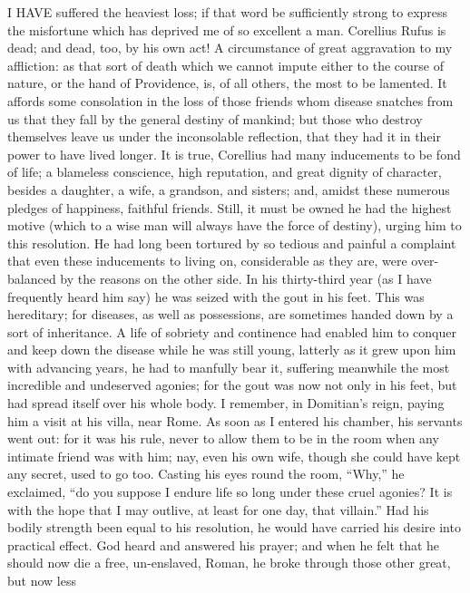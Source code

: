 
I HAVE suffered the heaviest loss; if that word be sufficiently strong to
express the misfortune which has deprived me of so excellent a man.
Corellius Rufus is dead; and dead, too, by his own act! A circumstance of
great aggravation to my affliction: as that sort of death which we cannot
impute either to the course of nature, or the hand of Providence, is, of
all others, the most to be lamented. It affords some consolation in the
loss of those friends whom disease snatches from us that they fall by the
general destiny of mankind; but those who destroy themselves leave us
under the inconsolable reflection, that they had it in their power to have
lived longer. It is true, Corellius had many inducements to be fond of
life; a blameless conscience, high reputation, and great dignity of
character, besides a daughter, a wife, a grandson, and sisters; and,
amidst these numerous pledges of happiness, faithful friends. Still, it
must be owned he had the highest motive (which to a wise man will always
have the force of destiny), urging him to this resolution. He had long
been tortured by so tedious and painful a complaint that even these
inducements to living on, considerable as they are, were over-balanced by
the reasons on the other side. In his thirty-third year (as I have
frequently heard him say) he was seized with the gout in his feet. This
was hereditary; for diseases, as well as possessions, are sometimes handed
down by a sort of inheritance. A life of sobriety and continence had
enabled him to conquer and keep down the disease while he was still young,
latterly as it grew upon him with advancing years, he had to manfully bear
it, suffering meanwhile the most incredible and undeserved agonies; for
the gout was now not only in his feet, but had spread itself over his
whole body. I remember, in Domitian's reign, paying him a visit at his
villa, near Rome. As soon as I entered his chamber, his servants went out:
for it was his rule, never to allow them to be in the room when any
intimate friend was with him; nay, even his own wife, though she could
have kept any secret, used to go too. Casting his eyes round the room,
``Why,'' he exclaimed, ``do you suppose I endure life so long under these
cruel agonies? It is with the hope that I may outlive, at least for one
day, that villain.'' Had his bodily strength been equal to his resolution,
he would have carried his desire into practical effect. God heard and
answered his prayer; and when he felt that he should now die a free,
un-enslaved, Roman, he broke through those other great, but now less
